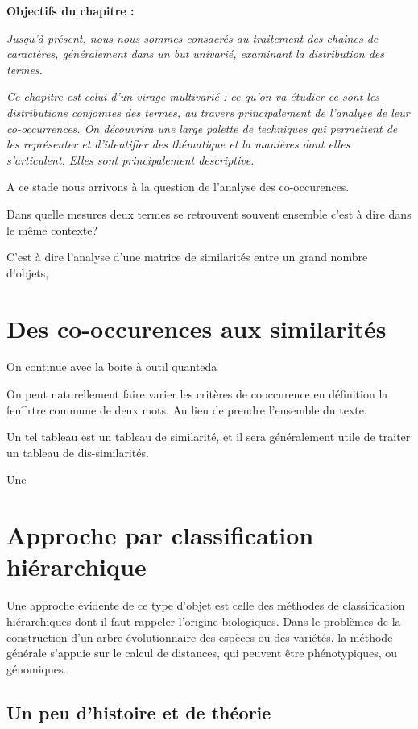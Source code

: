 \documentclass[
  letterpaper,
  DIV=11,
  numbers=noendperiod]{scrreprt}
\begin{document}
\textbf{Objectifs du chapitre :}

\emph{Jusqu'à présent, nous nous sommes consacrés au traitement des
chaines de caractères, généralement dans un but univarié, examinant la
distribution des termes.}

\emph{Ce chapitre est celui d'un virage multivarié : ce qu'on va étudier
ce sont les distributions conjointes des termes, au travers
principalement de l'analyse de leur co-occurrences. On découvrira une
large palette de techniques qui permettent de les représenter et
d'identifier des thématique et la manières dont elles s'articulent.
Elles sont principalement descriptive.}

A ce stade nous arrivons à la question de l'analyse des co-occurences.

Dans quelle mesures deux termes se retrouvent souvent ensemble c'est à
dire dans le même contexte?

C'est à dire l'analyse d'une matrice de similarités entre un grand
nombre d'objets,

\section{Des co-occurences aux
similarités}\label{des-co-occurences-aux-similarituxe9s}

On continue avec la boite à outil quanteda

On peut naturellement faire varier les critères de cooccurence en
définition la fen\^{}rtre commune de deux mots. Au lieu de prendre
l'ensemble du texte.

Un tel tableau est un tableau de similarité, et il sera généralement
utile de traiter un tableau de dis-similarités.

Une

\section{Approche par classification
hiérarchique}\label{approche-par-classification-hiuxe9rarchique}

Une approche évidente de ce type d'objet est celle des méthodes de
classification hiérarchiques dont il faut rappeler l'origine
biologiques. Dans le problèmes de la construction d'un arbre
évolutionnaire des espèces ou des variétés, la méthode générale s'appuie
sur le calcul de distances, qui peuvent être phénotypiques, ou
génomiques.

\subsection{Un peu d'histoire et de
théorie}\label{un-peu-dhistoire-et-de-thuxe9orie}
\end{document}
